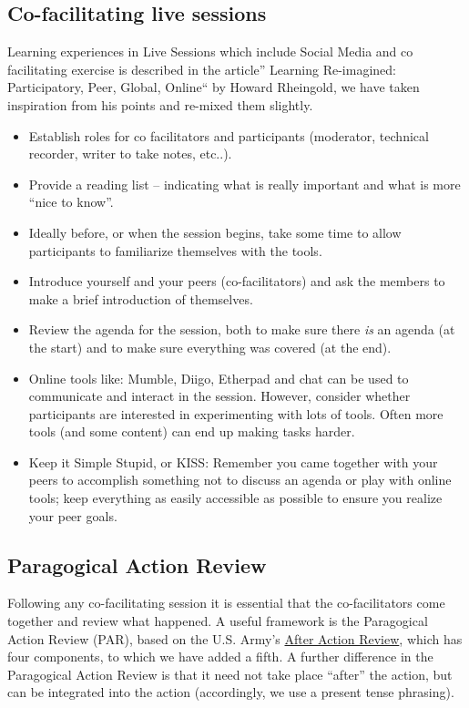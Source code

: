 \subsection{Co-facilitating live sessions}

Learning experiences in Live Sessions which include Social Media and co
facilitating exercise is described in the article'' Learning
Re-imagined: Participatory, Peer, Global, Online`` by Howard Rheingold,
we have taken inspiration from his points and re-mixed them slightly.

\begin{itemize}
\item
  Establish roles for co facilitators and participants (moderator,
  technical recorder, writer to take notes, etc..).
\item
  Provide a reading list -- indicating what is really important and what
  is more ``nice to know''.
\item
  Ideally before, or when the session begins, take some time to allow
  participants to familiarize themselves with the tools.
\item
  Introduce yourself and your peers (co-facilitators) and ask the
  members to make a brief introduction of themselves.
\item
  Review the agenda for the session, both to make sure there \emph{is}
  an agenda (at the start) and to make sure everything was covered (at
  the end).
\item
  Online tools like: Mumble, Diigo, Etherpad and chat can be used to
  communicate and interact in the session. However, consider whether
  participants are interested in experimenting with lots of tools. Often
  more tools (and some content) can end up making tasks harder.
\item
  Keep it Simple Stupid, or KISS: Remember you came together with your
  peers to accomplish something not to discuss an agenda or play with
  online tools; keep everything as easily accessible as possible to
  ensure you realize your peer goals.
\end{itemize}
\subsection{Paragogical Action Review}

Following any co-facilitating session it is essential that the
co-facilitators come together and review what happened. A useful
framework is the Paragogical Action Review (PAR), based on the U.S.
Army's
\href{http://www.africom.mil/WO-NCO/DownloadCenter/\%5C40Publications/Training\%20the\%20Force\%20Manual.pdf}{After
Action Review}, which has four components, to which we have added a
fifth. A further difference in the Paragogical Action Review is that it
need not take place ``after'' the action, but can be integrated into the
action (accordingly, we use a present tense phrasing).

